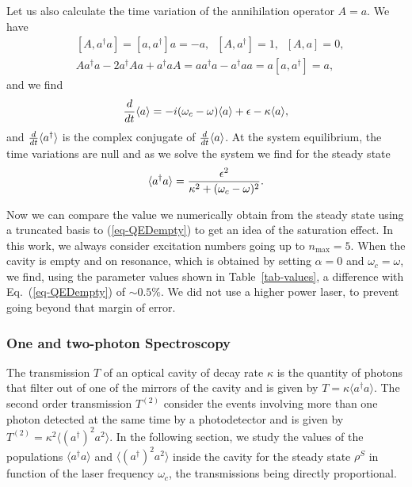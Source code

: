 Let us also calculate the time variation of the annihilation operator $A=a$. We have 
\begin{align}
&[A, a^\dagger a]= [a, a^\dagger ] a = -a  , \;\; [A, a^\dagger ] = 1, \;\; [A, a]= 0, \\
&Aa^\dagger a  - 2 a^\dagger A a + a^\dagger a A= a a^\dagger a - a^\dagger a a =  a [a, a^\dagger ] = a ,
\end{align}
and we find 
\[ \frac{d}{dt} \langle a \rangle =  -i(\omega_c - \omega) \langle a \rangle +\epsilon - \kappa \langle a \rangle, \]
and $\frac{d}{dt} \langle a^\dagger \rangle$ is the complex conjugate of $\frac{d}{dt} \langle a \rangle$.  At the system equilibrium, the time variations are null and as we solve the system we find for the steady state
\[\langle a^\dagger a \rangle = \frac{\epsilon^2}{\kappa^2 + (\omega_c-\omega)^2}.  \label{eq-QEDempty}\]

Now we can compare the value we numerically obtain from the steady state using a truncated basis to (\ref{eq-QEDempty}) to get an idea of the saturation effect. In this work, we always consider excitation numbers going up to $n_{\mbox{max}}=5$. When the cavity is empty and on resonance, which is obtained by setting $\alpha=0$ and $\omega_c = \omega$, we find, using the parameter values shown in Table~\ref{tab-values}, a difference with Eq.~(\ref{eq-QEDempty}) of $\sim 0.5\%$. We did not use a higher power laser, to prevent going beyond that margin of error.

\subsubsection{One and two-photon Spectroscopy}

The transmission $T$ of an optical cavity of decay rate $\kappa$ is the quantity of photons that filter out of one of the mirrors of the cavity and is given by $T=\kappa \langle a^\dagger a \rangle$. The second order transmission $T^{(2)}$  consider the events involving more than one photon detected at the same time by a photodetector and is given by $T^{(2)}=\kappa^2 \langle (a^\dagger)^2 a^2 \rangle$. In the following section, we study the values of the populations $\langle a^\dagger a \rangle$ and $\langle (a^\dagger)^2 a^2 \rangle$ inside the cavity for the steady state $\rho^S$ in function of the laser frequency $\omega_c$, the transmissions being directly proportional. 

